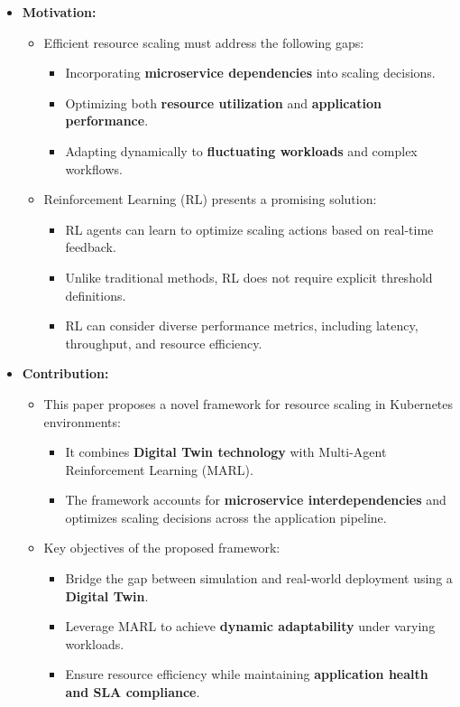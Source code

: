 \documentclass[conference]{IEEEtran}
\begin{document}
\begin{itemize}
    \item \textbf{Motivation:}
    \begin{itemize}
        \item Efficient resource scaling must address the following gaps:
        \begin{itemize}
            \item Incorporating \textbf{microservice dependencies} into scaling decisions.
            \item Optimizing both \textbf{resource utilization} and \textbf{application performance}.
            \item Adapting dynamically to \textbf{fluctuating workloads} and complex workflows.
        \end{itemize}
        \item Reinforcement Learning (RL) presents a promising solution:
        \begin{itemize}
            \item RL agents can learn to optimize scaling actions based on real-time feedback.
            \item Unlike traditional methods, RL does not require explicit threshold definitions.
            \item RL can consider diverse performance metrics, including latency, throughput, and resource efficiency.
        \end{itemize}
    \end{itemize}

    \item \textbf{Contribution:}
    \begin{itemize}
        \item This paper proposes a novel framework for resource scaling in Kubernetes environments:
        \begin{itemize}
            \item It combines \textbf{Digital Twin technology} with Multi-Agent Reinforcement Learning (MARL).
            \item The framework accounts for \textbf{microservice interdependencies} and optimizes scaling decisions across the application pipeline.
        \end{itemize}
        \item Key objectives of the proposed framework:
        \begin{itemize}
            \item Bridge the gap between simulation and real-world deployment using a \textbf{Digital Twin}.
            \item Leverage MARL to achieve \textbf{dynamic adaptability} under varying workloads.
            \item Ensure resource efficiency while maintaining \textbf{application health and SLA compliance}.
        \end{itemize}
    \end{itemize}


\end{itemize}
\end{document}
